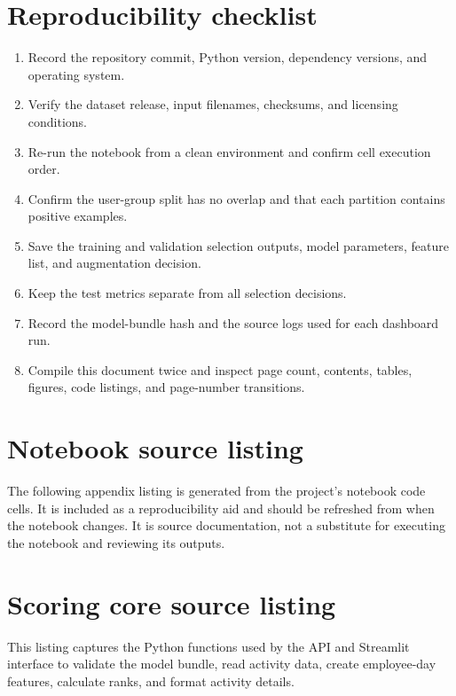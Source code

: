 \section{Reproducibility checklist}
\begin{enumerate}
  \item Record the repository commit, Python version, dependency
  versions, and operating system.
  \item Verify the dataset release, input filenames, checksums, and
  licensing conditions.
  \item Re-run the notebook from a clean environment and confirm cell
  execution order.
  \item Confirm the user-group split has no overlap and that each
  partition contains positive examples.
  \item Save the training and validation selection outputs, model
  parameters, feature list, and augmentation decision.
  \item Keep the test metrics separate from all selection decisions.
  \item Record the model-bundle hash and the source logs used for each
  dashboard run.
  \item Compile this document twice and inspect page count, contents,
  tables, figures, code listings, and page-number transitions.
\end{enumerate}

\section{Notebook source listing}
\label{app:notebook-source}
The following appendix listing is generated from the project's
notebook code cells. It is included as a reproducibility aid and should
be refreshed from  when the notebook
changes. It is source documentation, not a substitute for executing
the notebook and reviewing its outputs.

\clearpage


\section{Scoring core source listing}
\label{app:core-source}
This listing captures the Python functions used by the API and
Streamlit interface to validate the model bundle, read activity data,
create employee-day features, calculate ranks, and format activity
details.

